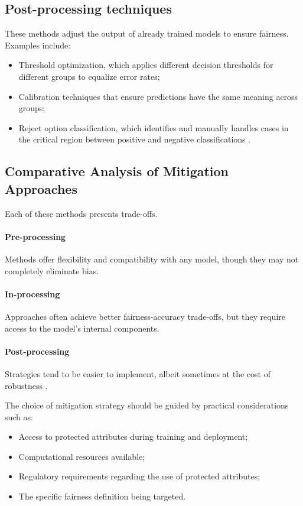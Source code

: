 \documentclass[12pt,a4paper,openright,twoside]{book}
\begin{document}
\subsection{Post-processing techniques} 
These methods adjust the output of already trained models to ensure fairness. Examples include:
\begin{itemize}
    \item Threshold optimization, which applies different decision thresholds for different groups to equalize error rates;
    \item Calibration techniques that ensure predictions have the same meaning across groups;
    \item Reject option classification, which identifies and manually handles cases in the critical region between positive and negative classifications \cite{kamiran2013quantifying}.
\end{itemize}

\subsection{Comparative Analysis of Mitigation Approaches}

Each of these methods presents trade-offs. 
\paragraph{Pre-processing} Methods offer flexibility and compatibility with any model, though they may not completely eliminate bias.
\paragraph{In-processing} Approaches often achieve better fairness-accuracy trade-offs, but they require access to the model’s internal components.
\paragraph{Post-processing} Strategies tend to be easier to implement, albeit sometimes at the cost of robustness \cite{mehrabi2021survey,suresh2021framework}.

The choice of mitigation strategy should be guided by practical considerations such as:

\begin{itemize}
    \item Access to protected attributes during training and deployment;
    \item Computational resources available;
    \item Regulatory requirements regarding the use of protected attributes;
    \item The specific fairness definition being targeted.
\end{itemize}
\end{document}
